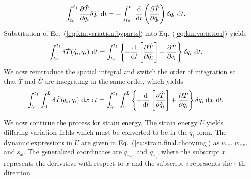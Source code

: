 \begin{equation}
\int_{t_0}^{t_1}\frac{\partial\hat T}{\partial \dot q_i}\delta \dot q_i\text{ d}t = -\int_{t_0}^{t_1}\frac{\text d}{\text dt}\left(\frac{\partial\hat T}{\partial \dot q_i}\right)\delta q_i\text{ d}t.
\label{eq:kin.variation.byparts}
\end{equation}
Substitution of Eq.~(\ref{eq:kin.variation.byparts}) into Eq.~(\ref{eq:kin.variation}) yields
\begin{equation}
\int_{t_0}^{t_1}\delta\hat T(\dot q_i,q_i)\text{ d}t = \int_{t_0}^{t_1}\left\lbrace-\frac{\text d}{\text dt}\left[\frac{\partial\hat T}{\partial \dot q_i}\right]+\frac{\partial\hat T}{\partial q_i}\right\rbrace\delta q_i\text{ d}t.
\end{equation}
We now reintroduce the spatial integral and switch the order of integration so that $\hat T$ and $\hat U$ are integrating in the same order, which yields
\begin{equation}
\int_{t_0}^{t_1}\int_0^L\delta\hat T(\dot q_i,q_i)\text{ d}x\text{ d}t = \int_{t_0}^{t_1}\int_0^L\left\lbrace-\frac{\text d}{\text dt}\left[\frac{\partial\hat T}{\partial \dot q_i}\right]+\frac{\partial\hat T}{\partial q_i}\right\rbrace\delta q_i\text{ d}x\text{ d}t.
\end{equation}

We now continue the process for strain energy. The strain energy $U$ yields differing variation fields which must be converted to be in the $q_i$ form. The dynamic expressions in $U$ are given in Eq.~(\ref{eq:strain.final.chooyung}) as $v_{xx}$, $w_{xx}$, and $s_x$. The generalized coordinates are $q_{xx_i}$ and $q_{x_i}$, where the subscript $x$ represents the derivative with respect to $x$ and the subscript $i$ represents the $i$-th direction.

